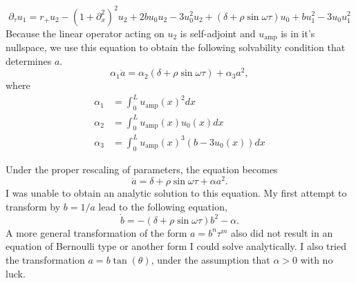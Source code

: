 \documentclass[pre,preprint,superscriptaddress]{revtex4-1}
\begin{document}
\begin{equation}
\partial_{\tau} u_1=r_+u_2-\left(1+\partial_{x}^2\right)^2u_2+2b u_0u_2-3u_0^2u_2 +(\delta+\rho \sin\omega \tau )u_0 +bu_1^2- 3u_0 u_1^2 \label{eq:SH}
\end{equation}
Because the linear operator acting on $u_2$ is self-adjoint and $u_{\text{amp}}$ is in it's nullspace, we use this equation to obtain the following solvability condition that determines $a$.  
\begin{equation}
\alpha_1 \dot{a} = \alpha_2 (\delta+\rho\sin\omega  \tau)+\alpha_3 a^2,
\end{equation}
where
\begin{align}
\alpha_1&=\int_0^L u_{\text{amp}}(x)^2 dx\\ \nonumber
\alpha_2&=\int_0^L u_{\text{amp}}(x) u_0(x) dx\\ \nonumber
\alpha_3&=\int_0^L u_{\text{amp}}(x)^3(b- 3u_0(x)) dx
\end{align}

Under the proper rescaling of parameters, the equation becomes
\begin{equation}
 \dot{a} =  \delta+\rho\sin\omega  \tau+\alpha a^2.
\end{equation}
I was unable to obtain an analytic solution to this equation.  My first attempt to transform by $b=1/a$ lead to the following equation,
\begin{equation}
 \dot{b} =  -(\delta+\rho\sin\omega  \tau) b^2-\alpha .
\end{equation}
A more general transformation of the form $a=b^n\tau^m$ also did not result in an equation of Bernoulli type or another form I could solve analytically.  I also tried the transformation $a= b \tan(\theta)$, under the assumption that $\alpha>0$ with no luck.  
\end{document}
